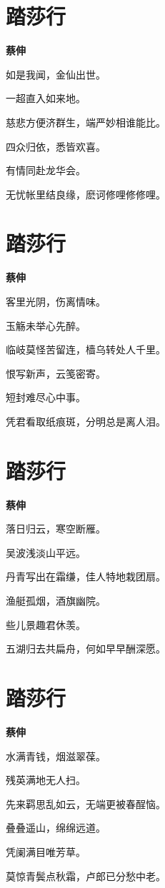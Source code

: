 \documentclass[12pt,a4paper]{ctexbook}
\begin{document}
\section{踏莎行}
\textbf{蔡伸}\par\vspace{0.5em}
如是我闻，金仙出世。\par
一超直入如来地。\par
慈悲方便济群生，端严妙相谁能比。\par
四众归依，悉皆欢喜。\par
有情同赴龙华会。\par
无忧帐里结良缘，麽诃修哩修修哩。\par

\section{踏莎行}
\textbf{蔡伸}\par\vspace{0.5em}
客里光阴，伤离情味。\par
玉觞未举心先醉。\par
临岐莫怪苦留连，樯乌转处人千里。\par
恨写新声，云笺密寄。\par
短封难尽心中事。\par
凭君看取纸痕斑，分明总是离人泪。\par

\section{踏莎行}
\textbf{蔡伸}\par\vspace{0.5em}
落日归云，寒空断雁。\par
吴波浅淡山平远。\par
丹青写出在霜缣，佳人特地栽团扇。\par
渔艇孤烟，酒旗幽院。\par
些儿景趣君休羡。\par
五湖归去共扁舟，何如早早酬深愿。\par

\section{踏莎行}
\textbf{蔡伸}\par\vspace{0.5em}
水满青钱，烟滋翠葆。\par
残英满地无人扫。\par
先来羁思乱如云，无端更被春酲恼。\par
叠叠遥山，绵绵远道。\par
凭阑满目唯芳草。\par
莫惊青鬓点秋霜，卢郎已分愁中老。\par
\end{document}
